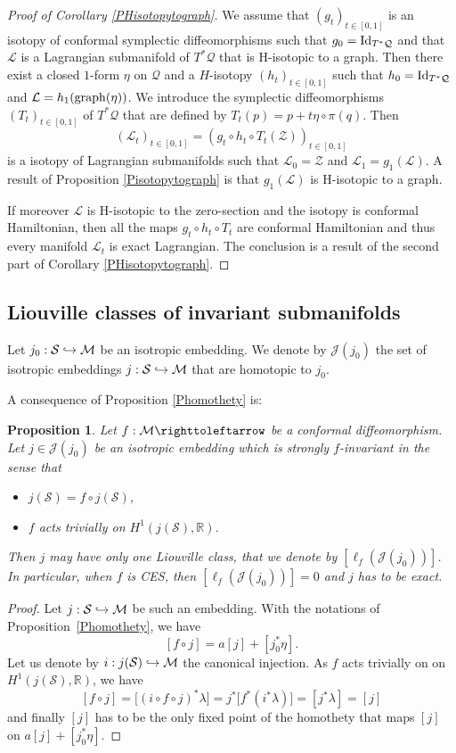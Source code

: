 \documentclass[JEP,XML,SOM,Unicode,published]{cedram}
\def\hto{\mathrel{\lhook\joinrel\to}}
\newtheorem{proposition}{Proposition}
\theoremstyle{definition}
\def\R{\mathbb{R}}
\def\cL{{\mathcal L}}
\def\cJ{{\mathcal J}}
\def\cM{{\mathcal M}}
\def\cQ{{\mathcal Q}}
\def\cS{{\mathcal S}}
\def\cZ{{\mathcal Z}}
\begin{document}
\begin{proof}[Proof of Corollary \ref{PHisotopytograph}]
We assume that $(g_t)_{t\in[0, 1]}$ is an isotopy of conformal symplectic diffeomorphisms such that $g_0={\rm Id}_{T^*\cQ}$ and that $\cL$ is a Lagrangian submanifold of $T^*\cQ$ that is H-isotopic to a graph. Then there exist a closed $1$-form $\eta$ on $\cQ$ and a $H$-isotopy $(h_t)_{t\in[0,1]}$ such that $h_0={\rm Id}_{T^*\cQ}$ and $\cL=h_1({\rm graph}(\eta))$. We introduce the symplectic diffeomorphisms $(T_t)_{t\in[0, 1]}$ of $T^*\cQ$ that are defined by $T_t(p)=p+t\eta\circ \pi(q)$. Then
\[
(\cL_t)_{t\in[0,1]}=(g_t\circ h_t\circ T_t(\cZ))_{t\in[0,1]}
\]
is a isotopy of Lagrangian submanifolds such that $\cL_0=\cZ$ and $\cL_1=g_1(\cL)$. A result of Proposition \ref{Pisotopytograph} is that $g_1(\cL)$ is H-isotopic to a graph.

If moreover $\cL$ is H-isotopic to the zero-section and the isotopy is conformal Hamiltonian, then all the maps $g_t\circ h_t\circ T_t$ are conformal Hamiltonian and thus every manifold $\cL_t$ is exact Lagrangian. The conclusion is a result of the second part of Corollary \ref{PHisotopytograph}.
\end{proof}

\subsection{Liouville classes of invariant submanifolds}

Let $ j_0:\cS\hto\cM$ be an isotropic embedding. We denote by $\cJ(j_0)$ the set of isotropic embeddings $ j:\cS\hto\cM$ that are homotopic to $j_0$.

A consequence of Proposition \ref{Phomothety} is:
\begin{proposition}\label{Puniqueclass}
Let $f: \cM \righttoleftarrow$ be a conformal diffeomorphism. Let $j\in\cJ(j_0)$ be an isotropic embedding which is strongly $f$-invariant in the sense that
\begin{itemize}
\item
$j(\cS)=f\circ j(\cS)$,
\item
$f$ acts trivially on $H^1(j(\cS),\R)$.
\end{itemize}
Then $j$ may have only one Liouville class, that we denote by $[\ell_f(\cJ(j_0))]$.
In particular, when $f$ is CES, then $[\ell_f(\cJ(j_0))]=0$ and $j$ has to be exact.
\end{proposition}

\begin{proof}
Let $ j:\cS\hto\cM$ be such an embedding. With the notations of Proposition~\ref{Phomothety}, we have
\[
[f\circ j]=a[j]+[j_0^*\eta].
\]
Let us denote by $i:j(\cS)\hto\cM$ the canonical injection. As $f$ acts trivially on on $H^1(j(\cS),\R)$, we have
\[
[f\circ j]=\big[(i\circ f\circ j)^*\lambda\big]=j^*\big[f^*(i^*\lambda)\big]=[j^*\lambda]=[j]
\]
and finally $[j]$ has to be the only fixed point of the homothety that maps $[j]$ on $a[j]+[j_0^*\eta]$.
\end{proof}
\end{document}
